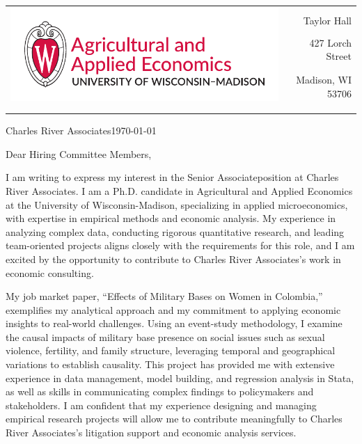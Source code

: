 \documentclass[12pt]{letter}
\begin{document}
\begin{tabularx}{\textwidth}{Xr}
\multirow{4}{*}{\includegraphics[height=3\baselineskip]{logo_cropped.pdf}} &  \\
& Taylor Hall \\
& 427 Lorch Street \\
& Madison, WI 53706 \\
[-1.8ex]\\
\\
\end{tabularx}

\newcommand{\compName}{Charles River Associates}
\newcommand{\posName}{Senior Associate}

\compName \hfill \today \\

\medskip

Dear Hiring Committee Members,

I am writing to express my interest in the \posName position at \compName. 
I am a Ph.D. candidate in Agricultural and Applied Economics at the University of Wisconsin-Madison, specializing in applied microeconomics, 
with expertise in empirical methods and economic analysis. My experience in analyzing complex data, conducting rigorous quantitative research, 
and leading team-oriented projects aligns closely with the requirements for this role, and I am excited by the opportunity to contribute 
to \compName's work in economic consulting.

My job market paper, “Effects of Military Bases on Women in Colombia,” exemplifies my analytical approach and my commitment to 
applying economic insights to real-world challenges. Using an event-study methodology, I examine the causal impacts of military base presence 
on social issues such as sexual violence, fertility, and family structure, leveraging temporal and geographical variations to establish causality. 
This project has provided me with extensive experience in data management, model building, and regression analysis in Stata, as well as skills 
in communicating complex findings to policymakers and stakeholders. I am confident that my experience designing and managing empirical research projects 
will allow me to contribute meaningfully to \compName's litigation support and economic analysis services.
\end{document}
